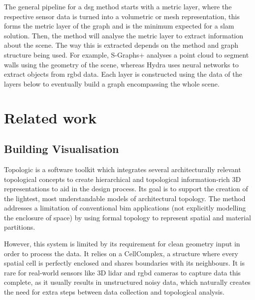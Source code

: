 The general pipeline for a \gls{dsg} method starts with a metric layer, where the respective sensor data is turned into a volumetric or mesh representation, this forms the metric layer of the graph and is the minimum expected for a \gls{slam} solution. Then, the method will analyse the metric layer to extract information about the scene. The way this is extracted depends on the method and graph structure being used. For example, S-Graphs+ \cite{s_graphs_plus} analyses a point cloud to segment walls using the geometry of the scene, whereas Hydra \cite{hydra} uses neural networks to extract objects from \acrshort{rgbd} data. Each layer is constructed using the data of the layers below to eventually build a graph encompassing the whole scene.

\bigskip
\bigskip


\section{Related work}\label{sec:related}

\subsection{Building Visualisation}\label{sec:related:topologic}

Topologic \cite{topologic} is a software toolkit which integrates several architecturally relevant topological concepts to create hierarchical and topological information-rich 3D representations to aid in the design process. Its goal is to support the creation of the lightest, most understandable models of architectural topology. The method addresses a limitation of conventional \gls{bim} applications (not explicitly modelling the enclosure of space) by using formal topology to represent spatial and material partitions.

However, this system is limited by its requirement for clean geometry input in order to process the data. It relies on a CellComplex, a structure where every spatial cell is perfectly enclosed and shares boundaries with its neighbours. It is rare for real-world sensors like 3D \acrshort{lidar} and \acrshort{rgbd} cameras to capture data this complete, as it usually results in unstructured noisy data, which naturally creates the need for extra steps between data collection and topological analysis.

